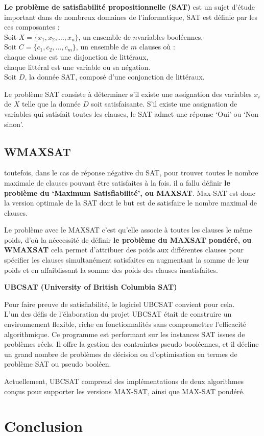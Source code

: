 \textbf{Le problème de satisfiabilité propositionnelle (SAT)} est un sujet d'étude important dans de nombreux domaines de l'informatique, SAT est définie par les ces composantes :\\
\hspace{2em}Soit $X=\{x_1, x_2,\dots, x_n\}$, un ensemble de $n$variables booléennes.\\
\hspace{2em}Soit $C=\{c_1, c_2,\dots, c_m\}$, un ensemble de $m$ clauses où :\\
\hspace{2em}chaque clause est une disjonction de littéraux,\\
\hspace{2em}chaque littéral est une variable ou sa négation.\\
\hspace{2em}Soit $D$, la donnée SAT, composé d'une conjonction de littéraux.

Le problème SAT consiste à déterminer s’il existe une assignation des variables $x_i$ de $X$ telle que la donnée $D$ soit satisfaisante. S’il existe une assignation de variables qui satisfait toutes les clauses, le SAT admet une réponse ‘Oui’ ou ‘Non sinon’. 
\subsection{WMAXSAT}

toutefois, dans le cas de réponse négative du SAT, pour trouver toutes le nombre maximale de clauses pouvant être satisfaites à la fois. il a fallu définir \textbf{le problème du ‘Maximum Satisfiabilité’, ou MAXSAT}. Max-SAT est donc la version optimale de la SAT dont le but est de satisfaire le nombre maximal de clauses.

Le problème avec le MAXSAT c’est qu’elle associe à toutes les clauses le même poids, d’où la néccessité de définir \textbf{le problème du MAXSAT pondéré, ou WMAXSAT} cela permet d'attribuer des poids aux différentes clauses pour spécifier les clauses simultanément satisfaites en augmentant la somme de leur poids et en affaiblissant la somme des poids des clauses insatisfaites.


\textbf{UBCSAT (University of British Columbia SAT)}

Pour faire preuve de satisfiabilité, le logiciel UBCSAT convient pour cela.\\
L'un des défis de l'élaboration du projet UBCSAT était de construire un environnement flexible, riche en fonctionnalités sans compromettre l'efficacité algorithmique. Ce programme est performant sur les instances SAT issues de problèmes réels. Il offre la gestion des contraintes pseudo booléennes, et il décline un grand nombre de problèmes de décision ou d’optimisation en termes de problème SAT ou pseudo booléen.    

Actuellement, UBCSAT comprend des implémentations de deux algorithmes conçus pour supporter les versions MAX-SAT, ainsi que MAX-SAT pondéré.

\section*{Conclusion}
